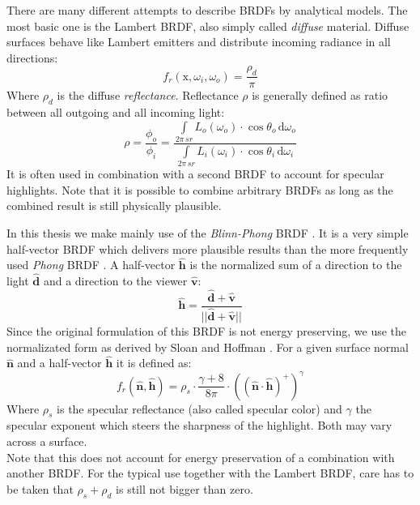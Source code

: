 \documentclass[thesis.tex]{subfiles}
\begin{document}
There are many different attempts to describe BRDFs by analytical models.
The most basic one is the Lambert BRDF, also simply called \emph{diffuse} material.
Diffuse surfaces behave like Lambert emitters and distribute incoming radiance in all directions:
\begin{equation}
f_r(\mathrm{x}, \omega_i, \omega_o) = \frac{\rho_d}{\pi}
\end{equation}
Where $\rho_d$ is the diffuse \emph{reflectance}.
Reflectance $\rho$ is generally defined as ratio between all outgoing and all incoming light:
\begin{equation}
\rho = \frac{\phi_o}{\phi_i} = \frac{\int\limits_{2\pi\,sr} L_o(\omega_o)\cdot \cos\theta_o  \, \mathrm{d}\omega_o}{\int\limits_{2\pi\,sr} L_i(\omega_i)\cdot \cos\theta_i  \, \mathrm{d}\omega_i}
\end{equation}
It is often used in combination with a second BRDF to account for specular highlights.
Note that it is possible to combine arbitrary BRDFs as long as the combined result is still physically plausible.

In this thesis we make mainly use of the \emph{Blinn-Phong} BRDF \cite{bib:blinnphongbrdf}.
It is a very simple half-vector BRDF which delivers more plausible results than the more frequently used \emph{Phong} BRDF \cite[p.~251f]{bib:RealtimeRenderingBook}.
A half-vector $\hat{\mathbf{h}}$ is the normalized sum of a direction to the light $\hat{\mathbf{d}}$ and a direction to the viewer $\hat{\mathbf{v}}$:
\begin{equation}
\hat{\mathbf{h}} = \frac{\hat{\mathbf{d}} + \hat{\mathbf{v}}}{||\hat{\mathbf{d}} + \hat{\mathbf{v}}||}
\end{equation}
Since the original formulation of this BRDF is not energy preserving, we use the normalizated form as derived by Sloan and Hoffman \cite[p.~257]{bib:RealtimeRenderingBook}.
For a given surface normal $\hat{\mathbf{n}}$ and a half-vector $\hat{\mathbf{h}}$ it is defined as:
\begin{equation}
f_r(\hat{\mathbf{n}}, \hat{\mathbf{h}}) = \rho_s \cdot \frac{\gamma + 8}{8\pi} \cdot ((\hat{\mathbf{n}} \cdot \hat{\mathbf{h}})^+)^\gamma
\end{equation}
Where $\rho_s$ is the specular reflectance (also called specular color) and $\gamma$ the specular exponent which steers the sharpness of the highlight.
Both may vary across a surface.
\\
Note that this does not account for energy preservation of a combination with another BRDF.
For the typical use together with the Lambert BRDF, care has to be taken that $\rho_s + \rho_d$ is still not bigger than zero.
\end{document}

